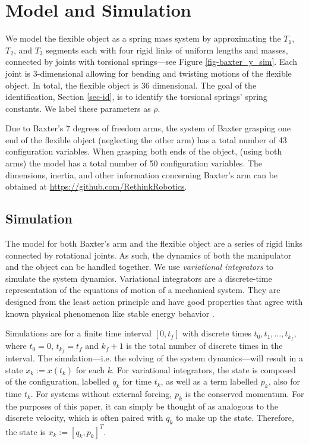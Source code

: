 \documentclass[runningheads,a4paper]{llncs}
\begin{document}
\section{Model and Simulation \label{sec-sim}}
\label{sec-sim}
We model the flexible object as a spring mass system by approximating the $T_1$, $T_2$, and $T_3$ segments each with four rigid links of uniform lengths and masses, connected by joints with torsional springs---see Figure \ref{fig-baxter_y_sim}. Each joint is 3-dimensional allowing for bending and twisting motions of the flexible object. In total, the flexible object is 36 dimensional. The goal of the identification, Section \ref{sec-id}, is to identify the torsional springs' spring constants. We label these parameters as $\rho$.

Due to Baxter's 7 degrees of freedom arms, the system of Baxter grasping one end of the flexible object (neglecting the other arm) has a total number of 43 configuration variables. When grasping both ends of the object, (using both arms) the model has a total number of 50 configuration variables. The dimensions, inertia, and other information concerning Baxter's arm can be obtained at \url{https://github.com/RethinkRobotics}.  

\subsection{Simulation}
The model for both Baxter's arm and the flexible object are a series of rigid links connected by rotational joints. As such, the dynamics of both the manipulator and the object can be handled together. We use \emph{variational integrators} to simulate the system dynamics.   Variational integrators are a discrete-time representation of the equations of motion of a mechanical system.  They are designed from the least action principle and have good properties that agree with known physical phenomenon like stable energy behavior \cite{pekarek_murphey}.  

Simulations are for a finite time interval $[0,t_f]$ with discrete times $t_0,t_1,\ldots,t_{k_f}$, where $t_0 = 0$, $t_{k_f} = t_f$ and $k_f+1$ is the total number of discrete times in the interval. The simulation---i.e. the solving of the system dynamics---will result in a state $x_k:=x(t_k)$ for each $k$.  For variational integrators, the state is composed of the configuration, labelled $q_k$ for time $t_k$, as well as a term labelled $p_k$, also for time $t_k$. For systems without external forcing, $p_k$ is the conserved momentum.  For the purposes of this paper, it can simply be thought of as analogous to the discrete velocity, which is often paired with $q_k$ to make up the state.  Therefore, the state is $x_k:=[q_k,p_k]^T$. 
\end{document}
